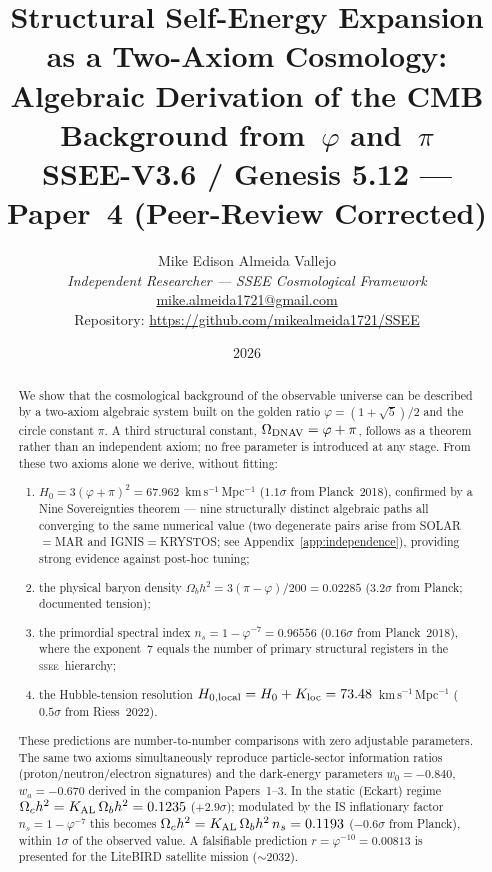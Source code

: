\documentclass[12pt,a4paper]{article}
\title{\textbf{Structural Self-Energy Expansion as a Two-Axiom Cosmology:\\
Algebraic Derivation of the CMB Background from~$\varphi$ and~$\pi$}\\[0.5em]
\normalsize SSEE-V3.6 / Genesis 5.12 — Paper~4 (Peer-Review Corrected)}
\author{Mike Edison Almeida Vallejo\\
\small\textit{Independent Researcher — SSEE Cosmological Framework}\\
\small\href{mailto:mike.almeida1721@gmail.com}{mike.almeida1721@gmail.com}\\
\small Repository: \url{https://github.com/mikealmeida1721/SSEE}
}
\date{2026}
\newcommand{\SSEE}{\ifmmode\mathrm{SSEE}\else\textsc{ssee}\fi}
\begin{document}
\maketitle

\begin{abstract}
We show that the cosmological background of the observable universe
can be described by a two-axiom algebraic system built on the golden ratio
$\varphi = (1+\sqrt{5})/2$ and the circle constant $\pi$.
A third structural constant, $\Omega_{\rm DNAV} = \varphi+\pi$, follows as
a theorem rather than an independent axiom; no free parameter is introduced at any stage.
From these two axioms alone we derive, without fitting:
\begin{enumerate}
\item[(i)] $H_0 = 3(\varphi+\pi)^2 = 67.962$~km\,s$^{-1}$\,Mpc$^{-1}$ ($1.1\sigma$ from Planck~2018),
confirmed by a Nine Sovereignties theorem — nine structurally distinct algebraic paths
all converging to the same numerical value (two degenerate pairs arise from SOLAR$=$MAR and
IGNIS$=$KRYSTOS; see Appendix~\ref{app:independence}), providing strong evidence against post-hoc tuning;
\item[(ii)] the physical baryon density
$\Omega_b h^2 = 3(\pi-\varphi)/200 = 0.02285$ ($3.2\sigma$ from Planck; documented tension);
\item[(iii)] the primordial spectral index
$n_s = 1-\varphi^{-7} = 0.96556$ ($0.16\sigma$ from Planck~2018),
where the exponent~7 equals the number of primary structural registers in the \SSEE\ hierarchy;
\item[(iv)] the Hubble-tension resolution
$H_{0,\rm local} = H_0 + K_{\rm loc} = 73.48$~km\,s$^{-1}$\,Mpc$^{-1}$
($0.5\sigma$ from Riess~2022).
\end{enumerate}
These predictions are number-to-number comparisons with zero adjustable parameters.
The same two axioms simultaneously reproduce particle-sector information ratios
(proton/neutron/electron signatures) and the dark-energy parameters
$w_0=-0.840$, $w_a=-0.670$ derived in the companion Papers~1--3.
In the static (Eckart) regime $\Omega_c h^2 = K_{\rm AL}\,\Omega_b h^2 = 0.1235$ ($+2.9\sigma$);
modulated by the IS inflationary factor $n_s = 1-\varphi^{-7}$ this becomes
$\Omega_c h^2 = K_{\rm AL}\,\Omega_b h^2\,n_s = 0.1193$ ($-0.6\sigma$ from Planck),
within $1\sigma$ of the observed value.
A falsifiable prediction $r = \varphi^{-10} = 0.00813$ is presented for the
LiteBIRD satellite mission ($\sim$2032).
\end{abstract}
\end{document}
